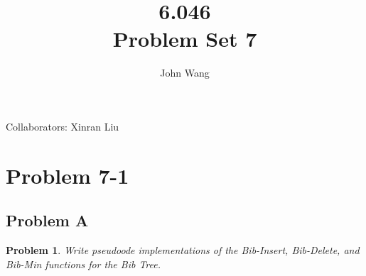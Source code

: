 \documentclass[psamsfonts]{amsart}
\title{6.046 \\
Problem Set 7}
\author{John Wang}
\newtheorem{prob}{Problem}[section]
\theoremstyle{definition}
\theoremstyle{remark}
\numberwithin{equation}{section}
\begin{document}
\maketitle

Collaborators: Xinran Liu

\section{Problem 7-1}

\subsection{Problem A}

\begin{prob}
Write pseudoode implementations of the Bib-Insert, Bib-Delete, and Bib-Min functions for the Bib Tree.
\end{prob}
\end{document}
